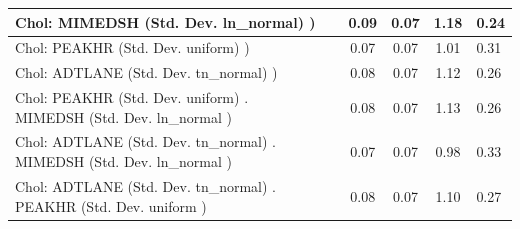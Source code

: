 \begin{table}
\begin{center}
\begin{tabular}{|l|l|c|c|c|l|}
			 Chol: MIMEDSH (Std. Dev. ln_normal) ) &  & 0.09 & 0.07 & 1.18 & 0.24 \\
			\hline
			 Chol: PEAKHR (Std. Dev. uniform) ) &  & 0.07 & 0.07 & 1.01 & 0.31 \\
			\hline
			 Chol: ADTLANE (Std. Dev. tn_normal) ) &  & 0.08 & 0.07 & 1.12 & 0.26 \\
			\hline
			 Chol: PEAKHR (Std. Dev. uniform) . MIMEDSH (Std. Dev.   ln_normal ) &  & 0.08 & 0.07 & 1.13 & 0.26 \\
			\hline
			 Chol: ADTLANE (Std. Dev. tn_normal) . MIMEDSH (Std. Dev.   ln_normal ) &  & 0.07 & 0.07 & 0.98 & 0.33 \\
			\hline
			 Chol: ADTLANE (Std. Dev. tn_normal) . PEAKHR (Std. Dev.   uniform ) &  & 0.08 & 0.07 & 1.10 & 0.27 \\
			\hline
		\end{tabular}
	\end{center}
\end{table}